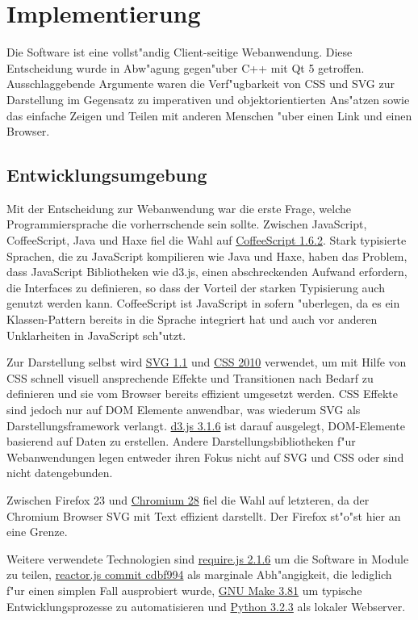 \section{Implementierung}

Die Software ist eine vollst"andig Client-seitige Webanwendung. Diese
Entscheidung wurde in Abw"agung gegen"uber C++ mit Qt 5 getroffen.
Ausschlaggebende Argumente waren die Verf"ugbarkeit von CSS und SVG zur
Darstellung im Gegensatz zu imperativen und objektorientierten Ans"atzen
sowie das einfache Zeigen und Teilen mit anderen Menschen "uber einen
Link und einen Browser.

\subsection{Entwicklungsumgebung}

Mit der Entscheidung zur Webanwendung war die erste Frage, welche
Programmiersprache die vorherrschende sein sollte. Zwischen JavaScript,
CoffeeScript, Java und Haxe fiel die Wahl auf
\href{http://coffeescript.org/}{CoffeeScript 1.6.2}. Stark typisierte
Sprachen, die zu JavaScript kompilieren wie Java und Haxe, haben das
Problem, dass JavaScript Bibliotheken wie d3.js, einen abschreckenden
Aufwand erfordern, die Interfaces zu definieren, so dass der Vorteil der
starken Typisierung auch genutzt werden kann. CoffeeScript ist
JavaScript in sofern "uberlegen, da es ein Klassen-Pattern bereits in die
Sprache integriert hat und auch vor anderen Unklarheiten in JavaScript
sch"utzt.

Zur Darstellung selbst wird \href{http://www.w3.org/TR/SVG11/}{SVG 1.1}
und \href{http://www.w3.org/TR/css-2010/}{CSS 2010} verwendet, um mit
Hilfe von CSS schnell visuell ansprechende Effekte und Transitionen nach Bedarf zu
definieren und sie vom Browser bereits effizient umgesetzt werden. CSS
Effekte sind jedoch nur auf DOM Elemente anwendbar, was wiederum SVG
als Darstellungsframework verlangt. \href{http://d3js.org/}{d3.js 3.1.6}
ist darauf ausgelegt, DOM-Elemente basierend auf Daten zu erstellen.
Andere Darstellungsbibliotheken f"ur Webanwendungen legen entweder ihren
Fokus nicht auf SVG und CSS oder sind nicht datengebunden.

Zwischen Firefox 23 und \href{http://www.chromium.org/Home}{Chromium 28}
fiel die Wahl auf letzteren, da der Chromium Browser SVG mit Text effizient
darstellt. Der Firefox st"o"st hier an eine Grenze.

Weitere verwendete Technologien sind
\href{http://requirejs.org/}{require.js 2.1.6} um die Software in Module
zu teilen, \href{https://github.com/fynyky/reactor.js}{reactor.js commit
cdbf994} als marginale Abh"angigkeit, die lediglich f"ur einen simplen
Fall ausprobiert wurde,
\href{https://www.gnu.org/software/make/}{GNU Make 3.81} um typische
Entwicklungsprozesse zu automatisieren und
\href{http://python.org/}{Python 3.2.3} als lokaler Webserver.

